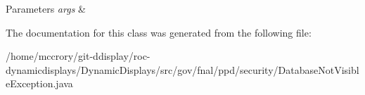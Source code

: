 \begin{DoxyParams}{Parameters}
{\em args} & \\
\hline
\end{DoxyParams}


The documentation for this class was generated from the following file\-:\begin{DoxyCompactItemize}
\item 
/home/mccrory/git-\/ddisplay/roc-\/dynamicdisplays/\-Dynamic\-Displays/src/gov/fnal/ppd/security/Database\-Not\-Visible\-Exception.\-java\end{DoxyCompactItemize}
